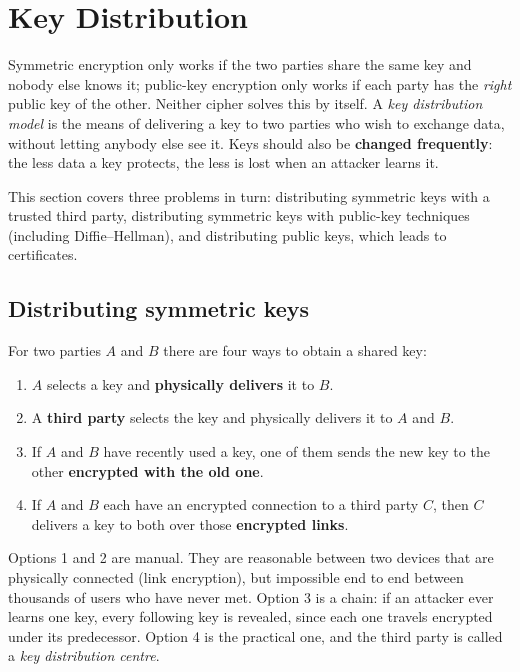 \section{Key Distribution}
\label{sec:key-distribution}

Symmetric encryption only works if the two parties share the same key and nobody else knows it; public-key encryption only works if each party has the \emph{right} public key of the other. Neither cipher solves this by itself. A \emph{key distribution model} is the means of delivering a key to two parties who wish to exchange data, without letting anybody else see it. Keys should also be \textbf{changed frequently}: the less data a key protects, the less is lost when an attacker learns it.

This section covers three problems in turn: distributing symmetric keys with a trusted third party, distributing symmetric keys with public-key techniques (including Diffie--Hellman), and distributing public keys, which leads to certificates.


\subsection{Distributing symmetric keys}

For two parties $A$ and $B$ there are four ways to obtain a shared key:
\begin{enumerate}
    \item $A$ selects a key and \textbf{physically delivers} it to $B$.
    \item A \textbf{third party} selects the key and physically delivers it to $A$ and $B$.
    \item If $A$ and $B$ have recently used a key, one of them sends the new key to the other \textbf{encrypted with the old one}.
    \item If $A$ and $B$ each have an encrypted connection to a third party $C$, then $C$ delivers a key to both over those \textbf{encrypted links}.
\end{enumerate}
Options 1 and 2 are manual. They are reasonable between two devices that are physically connected (link encryption), but impossible end to end between thousands of users who have never met. Option 3 is a chain: if an attacker ever learns one key, every following key is revealed, since each one travels encrypted under its predecessor. Option 4 is the practical one, and the third party is called a \emph{key distribution centre}.

